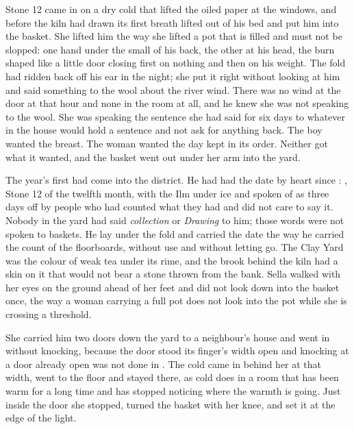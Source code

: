 
Stone 12 came in on a dry cold that lifted the oiled paper at the windows, and before the kiln had drawn its first breath  lifted  out of his bed and put him into the basket. She lifted him the way she lifted a pot that is filled and must not be slopped: one hand under the small of his back, the other at his head, the burn shaped like a little door closing first on nothing and then on his weight. The fold had ridden back off his ear in the night; she put it right without looking at him and said something to the wool about the river wind. There was no wind at the door at that hour and none in the room at all, and he knew she was not speaking to the wool. She was speaking the sentence she had said for six days to whatever in the house would hold a sentence and not ask for anything back. The boy wanted the breast. The woman wanted the day kept in its order. Neither got what it wanted, and the basket went out under her arm into the yard.

The year's first  had come into the district. He had had the date by heart since : , Stone 12 of the twelfth month, with the Ilm under ice and  spoken of as three days off by people who had counted what they had and did not care to say it. Nobody in the yard had said \emph{collection} or \emph{Drawing} to him; those words were not spoken to baskets. He lay under the fold and carried the date the way he carried the count of the floorboards, without use and without letting go. The Clay Yard was the colour of weak tea under its rime, and the brook behind the kiln had a skin on it that would not bear a stone thrown from the bank. Sella walked with her eyes on the ground ahead of her feet and did not look down into the basket once, the way a woman carrying a full pot does not look into the pot while she is crossing a threshold.

She carried him two doors down the yard to a neighbour's house and went in without knocking, because the door stood its finger's width open and knocking at a door already open was not done in . The cold came in behind her at that width, went to the floor and stayed there, as cold does in a room that has been warm for a long time and has stopped noticing where the warmth is going. Just inside the door she stopped, turned the basket with her knee, and set it at the edge of the light.

